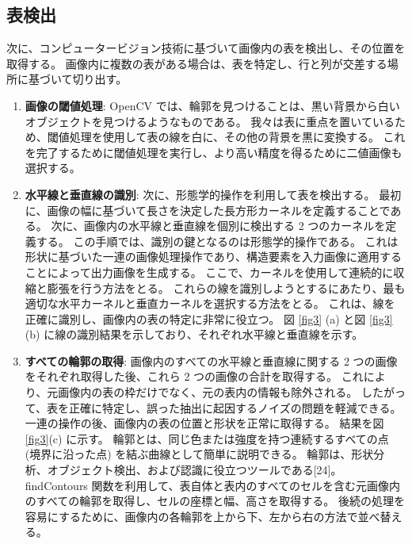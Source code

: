 \documentclass[uplatex, twocolumn,10pt]{jsarticle}
\begin{document}
\subsection{表検出}
次に、コンピュータービジョン技術に基づいて画像内の表を検出し、その位置を取得する。
画像内に複数の表がある場合は、表を特定し、行と列が交差する場所に基づいて切り出す。

\begin{enumerate}
    \item \textbf{画像の閾値処理}: 
    OpenCV では、輪郭を見つけることは、黒い背景から白いオブジェクトを見つけるようなものである。
    我々は表に重点を置いているため、閾値処理を使用して表の線を白に、その他の背景を黒に変換する。
    これを完了するために閾値処理を実行し、より高い精度を得るために二値画像も選択する。
    \item \textbf{水平線と垂直線の識別}:
    次に、形態学的操作を利用して表を検出する。
    最初に、画像の幅に基づいて長さを決定した長方形カーネルを定義することである。
    次に、画像内の水平線と垂直線を個別に検出する 2 つのカーネルを定義する。
    この手順では、識別の鍵となるのは形態学的操作である。
    これは形状に基づいた一連の画像処理操作であり、構造要素を入力画像に適用することによって出力画像を生成する。
    ここで、カーネルを使用して連続的に収縮と膨張を行う方法をとる。
    これらの線を識別しようとするにあたり、最も適切な水平カーネルと垂直カーネルを選択する方法をとる。
    これは、線を正確に識別し、画像内の表の特定に非常に役立つ。
    図 \ref{fig3} (a) と図 \ref{fig3} (b) に線の識別結果を示しており、それぞれ水平線と垂直線を示す。
    \item \textbf{すべての輪郭の取得}:
    画像内のすべての水平線と垂直線に関する 2 つの画像をそれぞれ取得した後、これら 2 つの画像の合計を取得する。
    これにより、元画像内の表の枠だけでなく、元の表内の情報も除外される。
    したがって、表を正確に特定し、誤った抽出に起因するノイズの問題を軽減できる。
    一連の操作の後、画像内の表の位置と形状を正常に取得する。
    結果を図 \ref{fig3}(c) に示す。
    輪郭とは、同じ色または強度を持つ連続するすべての点 (境界に沿った点) を結ぶ曲線として簡単に説明できる。
    輪郭は、形状分析、オブジェクト検出、および認識に役立つツールである[24]。
    findContours 関数を利用して、表自体と表内のすべてのセルを含む元画像内のすべての輪郭を取得し、セルの座標と幅、高さを取得する。
    後続の処理を容易にするために、画像内の各輪郭を上から下、左から右の方法で並べ替える。
\end{enumerate}
\end{document}
